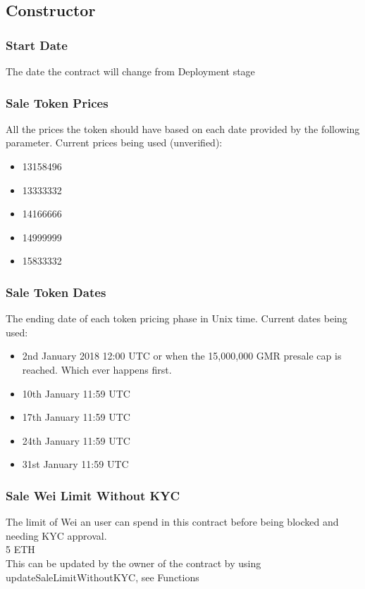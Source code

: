 \documentclass[11pt]{article} %
\begin{document}
\subsection{Constructor}

\subsubsection{Start Date}
The date the contract will change from Deployment stage


\subsubsection{Sale Token Prices}
All the prices the token should have based on each date provided by the following parameter.
Current prices being used (unverified): 

\begin{itemize}
\item 13158496
\item 13333332
\item 14166666
\item 14999999
\item 15833332
\end{itemize}


\subsubsection{Sale Token Dates}
The ending date of each token pricing phase in Unix time.
Current dates being used:

\begin{itemize}
\item 2nd January 2018 12:00 UTC or when the 15,000,000 GMR presale cap is reached. Which ever happens first.
\item 10th January 11:59 UTC
\item 17th January 11:59 UTC
\item 24th January 11:59 UTC
\item 31st January 11:59 UTC
\end{itemize}


\subsubsection{Sale Wei Limit Without KYC}
The limit of Wei an user can spend in this contract before being blocked and needing KYC approval.\\
5 ETH\\
This can be updated by the owner of the contract by using updateSaleLimitWithoutKYC, see Functions
\end{document}
